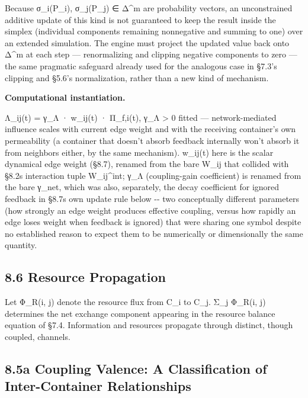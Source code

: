 \documentclass[
]{article}
\begin{document}
Because σ\_i(P\_i), σ\_j(P\_j) ∈ Δ\^{}m are probability vectors, an
unconstrained additive update of this kind is not guaranteed to keep the
result inside the simplex (individual components remaining nonnegative
and summing to one) over an extended simulation. The engine must project
the updated value back onto Δ\^{}m at each step --- renormalizing and
clipping negative components to zero --- the same pragmatic safeguard
already used for the analogous case in §7.3's clipping and §5.6's
normalization, rather than a new kind of mechanism.

\textbf{Computational instantiation.}

Λ\_ij(t) = γ\_Λ · w\_ij(t) · Π\_f,i(t), γ\_Λ \textgreater{} 0 fitted ---
network-mediated influence scales with current edge weight and with the
receiving container's own permeability (a container that doesn't absorb
feedback internally won't absorb it from neighbors either, by the same
mechanism). w\_ij(t) here is the scalar dynamical edge weight (§8.7),
renamed from the bare W\_ij that collided with §8.2s interaction tuple
W\_ij\^{}int; γ\_Λ (coupling-gain coefficient) is renamed from the bare
γ\_net, which was also, separately, the decay coefficient for ignored
feedback in §8.7s own update rule below -\/- two conceptually different
parameters (how strongly an edge weight produces effective coupling,
versus how rapidly an edge loses weight when feedback is ignored) that
were sharing one symbol despite no established reason to expect them to
be numerically or dimensionally the same quantity.

\hypertarget{resource-propagation}{%
\subsection{8.6 Resource Propagation}\label{resource-propagation}}

Let Φ\_R(i, j) denote the resource flux from C\_i to C\_j. Σ\_j Φ\_R(i,
j) determines the net exchange component appearing in the resource
balance equation of §7.4. Information and resources propagate through
distinct, though coupled, channels.

\hypertarget{a-coupling-valence-a-classification-of-inter-container-relationships}{%
\subsection{8.5a Coupling Valence: A Classification of Inter-Container
Relationships}\label{a-coupling-valence-a-classification-of-inter-container-relationships}}
\end{document}
